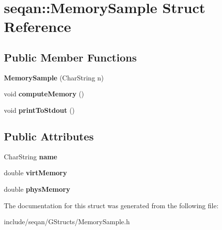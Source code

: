 \hypertarget{structseqan_1_1_memory_sample}{\section{seqan\-:\-:\-Memory\-Sample \-Struct \-Reference}
\label{structseqan_1_1_memory_sample}
}
\subsection*{\-Public \-Member \-Functions}
\begin{DoxyCompactItemize}
\item 
\hypertarget{structseqan_1_1_memory_sample_ad9d482e58b6a39fd69b95dcba0826626}{{\bfseries \-Memory\-Sample} (\-Char\-String n)}\label{structseqan_1_1_memory_sample_ad9d482e58b6a39fd69b95dcba0826626}

\item 
\hypertarget{structseqan_1_1_memory_sample_a7d0286090f1dc096cad63a5088feb26b}{void {\bfseries compute\-Memory} ()}\label{structseqan_1_1_memory_sample_a7d0286090f1dc096cad63a5088feb26b}

\item 
\hypertarget{structseqan_1_1_memory_sample_a2f93fe0280338e4dad0c479ba3a3b778}{void {\bfseries print\-To\-Stdout} ()}\label{structseqan_1_1_memory_sample_a2f93fe0280338e4dad0c479ba3a3b778}

\end{DoxyCompactItemize}
\subsection*{\-Public \-Attributes}
\begin{DoxyCompactItemize}
\item 
\hypertarget{structseqan_1_1_memory_sample_ac73b3a108cbef1afe887b007fd691b89}{\-Char\-String {\bfseries name}}\label{structseqan_1_1_memory_sample_ac73b3a108cbef1afe887b007fd691b89}

\item 
\hypertarget{structseqan_1_1_memory_sample_a22b5eb5bbe60a5d9cb9b6cd6d2160412}{double {\bfseries virt\-Memory}}\label{structseqan_1_1_memory_sample_a22b5eb5bbe60a5d9cb9b6cd6d2160412}

\item 
\hypertarget{structseqan_1_1_memory_sample_a9e83041889b177e0b3942e9b10492e4a}{double {\bfseries phys\-Memory}}\label{structseqan_1_1_memory_sample_a9e83041889b177e0b3942e9b10492e4a}

\end{DoxyCompactItemize}


\-The documentation for this struct was generated from the following file\-:\begin{DoxyCompactItemize}
\item 
include/seqan/\-G\-Structs/\-Memory\-Sample.\-h\end{DoxyCompactItemize}
